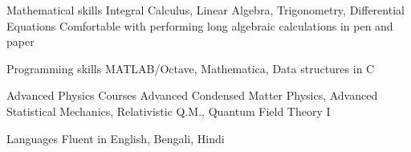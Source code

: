 

\begin{cvskills}


  
  \cvskill
	{Mathematical skills} %
	{Integral Calculus, Linear Algebra, Trigonometry, Differential Equations}
  \cvskill
	{}
	{Comfortable with performing long algebraic calculations in pen and paper} %

  \cvskill
    {Programming skills} %
    {MATLAB/Octave, Mathematica, Data structures in C} %

  \cvskill
{Advanced Physics Courses} %
{Advanced Condensed Matter Physics, Advanced Statistical Mechanics, Relativistic Q.M., Quantum Field Theory I} %

  \cvskill
    {Languages} %
    {Fluent in English, Bengali, Hindi} %

\end{cvskills}
